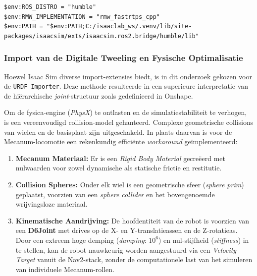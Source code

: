 \begin{listing}[h]
\caption{Initialisatie van de ROS 2 omgeving voor isaac sim.}
\begin{verbatim}
$env:ROS_DISTRO = "humble"
$env:RMW_IMPLEMENTATION = "rmw_fastrtps_cpp"
$env:PATH = "$env:PATH;C:/isaaclab_ws/.venv/lib/site-packages/isaacsim/exts/isaacsim.ros2.bridge/humble/lib"
\end{verbatim}
\end{listing}

\subsubsection{Import van de Digitale Tweeling en Fysische Optimalisatie}
Hoewel Isaac Sim diverse import-extensies biedt, is in dit onderzoek gekozen voor de \texttt{URDF Importer}. Deze methode resulteerde in een superieure interpretatie van de hiërarchische \textit{joint}-structuur zoals gedefinieerd in Onshape.

Om de fysica-engine (\textit{PhysX}) te ontlasten en de simulatiestabiliteit te verhogen, is een vereenvoudigd collision-model gehanteerd. Complexe geometrische collisions van wielen en de basisplaat zijn uitgeschakeld. In plaats daarvan is voor de Mecanum-locomotie een rekenkundig efficiënte \textit{workaround} geïmplementeerd:
\begin{enumerate}
\item \textbf{Mecanum Materiaal:} Er is een \textit{Rigid Body Material} gecreëerd met nulwaarden voor zowel dynamische als statische frictie en restitutie.
\item \textbf{Collision Spheres:} Onder elk wiel is een geometrische sfeer (\textit{sphere prim}) geplaatst, voorzien van een \textit{sphere collider} en het bovengenoemde wrijvingsloze materiaal.
\item \textbf{Kinematische Aandrijving:} De hoofdentiteit van de robot is voorzien van een \textbf{D6Joint} met drives op de X- en Y-translatieassen en de Z-rotatieas. Door een extreem hoge demping (\textit{damping}: $10^6$) en nul-stijfheid (\textit{stiffness}) in te stellen, kan de robot nauwkeurig worden aangestuurd via een \textit{Velocity Target} vanuit de Nav2-stack, zonder de computationele last van het simuleren van individuele Mecanum-rollen.
\end{enumerate}


